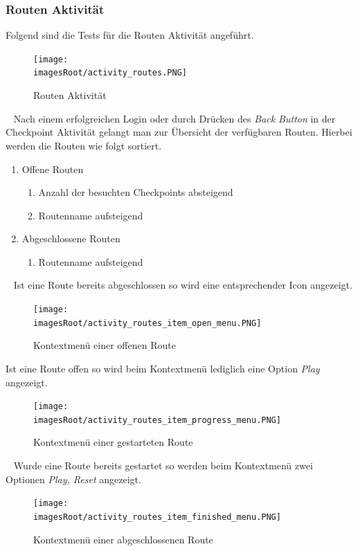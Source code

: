 \documentclass[11pt, a4paper, twoside]{article}   	%
\newcommand{\imagesRoot}{images}
\begin{document}
\subsubsection{Routen Aktivität}
Folgend sind die Tests für die Routen Aktivität angeführt.
\begin{figure}[h]
	\centering
	\texttt{[image: \\imagesRoot/activity\_routes.PNG]}
	\caption
	{Routen Aktivität}
\end{figure}
\ \newline
Nach einem erfolgreichen Login oder durch Drücken des \emph{Back Button} in der Checkpoint Aktivität gelangt man zur Übersicht der verfügbaren Routen. Hierbei werden die Routen wie folgt sortiert.
\begin{enumerate}
	\item Offene Routen
	\begin{enumerate}
		\item 
	Anzahl der besuchten Checkpoints absteigend
		\item Routenname aufsteigend
	\end{enumerate}
	\item Abgeschlossene Routen
	\begin{enumerate}
		\item Routenname aufsteigend
	\end{enumerate}
\end{enumerate}
\ \newline
Ist eine Route bereits abgeschlossen so wird eine entsprechender Icon angezeigt.
\newpage
\begin{figure}[h]
	\centering
	\texttt{[image: \\imagesRoot/activity\_routes\_item\_open\_menu.PNG]}
	\caption
	{Kontextmenü einer offenen Route}
\end{figure}
Ist eine Route offen so wird beim Kontextmenü lediglich eine Option \emph{Play} angezeigt.
\newline
\begin{figure}[h]
	\centering
	\texttt{[image: \\imagesRoot/activity\_routes\_item\_progress\_menu.PNG]}
	\caption
	{Kontextmenü einer gestarteten Route}
\end{figure}
\ \newline
Wurde eine Route bereits gestartet so werden beim Kontextmenü zwei Optionen \emph{Play, Reset} angezeigt.
\newline
\begin{figure}[h]
	\centering
	\texttt{[image: \\imagesRoot/activity\_routes\_item\_finished\_menu.PNG]}
	\caption
	{Kontextmenü einer abgeschlossenen Route}
\end{figure}
\end{document}
